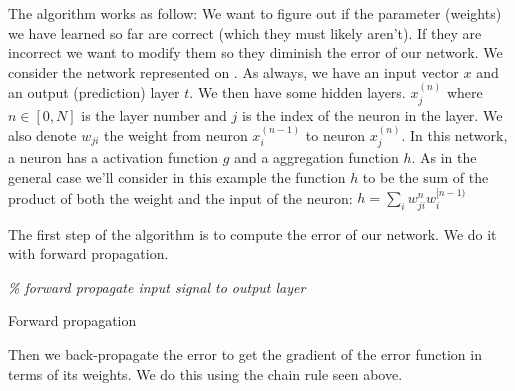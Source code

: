 	





	The algorithm works as follow:
	We want to figure out if the parameter (weights) we have learned so far are correct (which they must likely aren't). If they are incorrect we want to modify them so they diminish the error of our network. We consider the network represented on . As always, we have an input vector $x$ and an output (prediction) layer $t$. We then have some hidden layers. $x_j^{(n)}$ where $n \in [0,N]$ is the layer number and $j$ is the index of the neuron in the layer. We also denote $w_{ji}$ the weight from neuron $x_i^{(n-1)}$ to neuron $x_j^{(n)}$.
	In this network, a neuron has a activation function $g$ and a aggregation function $h$. As in the general case we'll consider in this example the function $h$ to be the sum of the product of both the weight and the input of the neuron: $h = \sum_i w_{ji}^n w_i^{[n-1)}$

	The first step of the algorithm is to compute the error of our network. We do it with forward propagation.

	\begin{algorithm}[H]
		\BlankLine
		\emph{\% forward propagate input signal to output layer}\;
	\caption{Forward propagation}
	\label{alg:forward_propagation}
	\end{algorithm}
	
	Then we back-propagate the error to get the gradient of the error function in terms of its weights. We do this using the chain rule seen above. 

